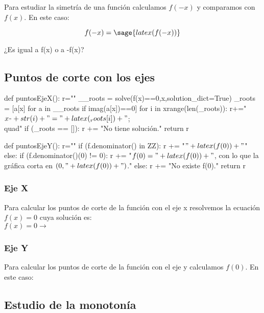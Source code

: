 \ifverbose
    Para estudiar la simetría de una función calculamos $f(-x)$ y comparamos con $f(x)$. 
    En este caso:
\fi

\[f(-x) = \sage{latex(f(-x))}\]

¿Es igual a f(x) o a -f(x)? 

\subsection{Puntos de corte con los ejes}
\begin{sagesilent}
def puntosEjeX():
    r=""
    __roots = solve(f(x)==0,x,solution_dict=True)
    _roots = [a[x] for a in __roots if imag(a[x])==0]
    for i in xrange(len(_roots)):
        r+="$x_"+str(i)+" = "+latex(_roots[i])+"$;\\quad"
    if (_roots == []):
        r += "No tiene solución."
    return r

def puntosEjeY():
    r=""
    if (f.denominator() in ZZ):
        r += "$" + latex(f(0)) +"$"
    else:
        if (f.denominator()(0) != 0):
            r += "$f(0) = " + latex(f(0)) + "$, con lo que la gráfica corta en $(0,"+latex(f(0)) + ")$."   
        else:
            r +=  "No existe f(0)."    
    return r

\end{sagesilent}

\subsubsection{Eje X}
\ifverbose
Para calcular los puntos de corte de la función con el eje x resolvemos la ecuación $f(x) = 0$ cuya solución es: 
\\

\else 
$f(x) = 0\rightarrow $
\fi
{}

\subsubsection{Eje Y}
\ifverbose
Para calcular los puntos de corte de la función con el eje y calculamos $f(0)$. 
%
En este caso:
\fi
{}


\subsection{Estudio de la monotonía}

